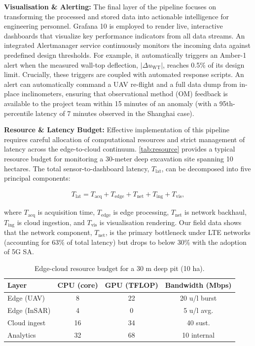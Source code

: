 \documentclass[preprint,11pt,authoryear,3p]{elsarticle}
\begin{document}
\textbf{Visualisation \& Alerting:} The final layer of the pipeline focuses on transforming the processed and stored data into actionable intelligence for engineering personnel. Grafana 10 is employed to render live, interactive dashboards that visualize key performance indicators from all data streams. An integrated Alertmanager service continuously monitors the incoming data against predefined design thresholds. For example, it automatically triggers an Amber-1 alert when the measured wall-top deflection, $\lvert\Delta u_{\text{WT}}\rvert$, reaches 0.5\% of its design limit. Crucially, these triggers are coupled with automated response scripts. An alert can automatically command a UAV re-flight and a full data dump from in-place inclinometers, ensuring that observational method (OM) feedback is available to the project team within 15 minutes of an anomaly (with a 95th-percentile latency of 7 minutes observed in the Shanghai case).

\textbf{Resource \& Latency Budget:} Effective implementation of this pipeline requires careful allocation of computational resources and strict management of latency across the edge-to-cloud continuum. \autoref{tab:resource} provides a typical resource budget for monitoring a 30-meter deep excavation site spanning 10 hectares. The total sensor-to-dashboard latency, $T_{\text{lat}}$, can be decomposed into five principal components:

\begin{align}
  T_{\text{lat}}
  = T_{\text{acq}} + T_{\text{edge}} + T_{\text{net}}
  + T_{\text{ing}} + T_{\text{vis}},
\end{align}

where $T_{\text{acq}}$ is acquisition time, $T_{\text{edge}}$ is edge processing, $T_{\text{net}}$ is network backhaul, $T_{\text{ing}}$ is cloud ingestion, and $T_{\text{vis}}$ is visualisation rendering. Our field data shows that the network component, $T_{\text{net}}$, is the primary bottleneck under LTE networks (accounting for 63\% of total latency) but drops to below 30\% with the adoption of 5G SA.

\begin{table}[htbp]
\centering\small
\caption{Edge-cloud resource budget for a 30 m deep pit (10 ha).}
\label{tab:resource}
\begin{tabular}{@{}lccc@{}}
\toprule
\textbf{Layer} & \textbf{CPU (core)} & \textbf{GPU (TFLOP)} &
\textbf{Bandwidth (Mbps)}\\
\midrule
Edge (UAV)    & 8  & 22 & 20 u/l burst \\
Edge (InSAR)  & 4  &  0 &  5 u/l avg. \\
Cloud ingest  & 16 & 34 & 40 sust. \\
Analytics     & 32 & 68 & 10 internal \\
\bottomrule
\end{tabular}
\end{table}
\end{document}
